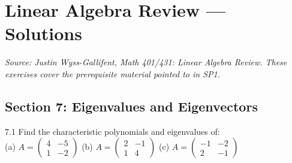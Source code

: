 \chapter{Linear Algebra Review --- Solutions}

\noindent\textit{Source: Justin Wyss-Gallifent, \textit{Math 401/431: Linear Algebra Review}.
These exercises cover the prerequisite material pointed to in SP1.}

\section*{Section 7: Eigenvalues and Eigenvectors}

\begin{exercise}{7.1}
Find the characteristic polynomials and eigenvalues of:\\
(a) $A=\begin{pmatrix}4&-5\\1&-2\end{pmatrix}$\quad
(b) $A=\begin{pmatrix}2&-1\\1&4\end{pmatrix}$\quad
(c) $A=\begin{pmatrix}-1&-2\\2&-1\end{pmatrix}$
\end{exercise}
